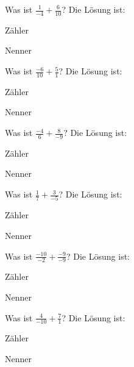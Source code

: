 \documentclass{ximera}
\begin{document}
\begin{shuffle}
\begin{question}
Was ist $\frac{1}{-4} + \frac{6}{10}$?
Die Lösung ist:
\begin{solution}
Zähler 
\end{solution}
\begin{solution}
Nenner 
\end{solution}
\end{question}


\begin{question}
Was ist $\frac{-6}{10} + \frac{5}{1}$?
Die Lösung ist:
\begin{solution}
Zähler 
\end{solution}
\begin{solution}
Nenner 
\end{solution}
\end{question}


\begin{question}
Was ist $\frac{-4}{6} + \frac{8}{-9}$?
Die Lösung ist:
\begin{solution}
Zähler 
\end{solution}
\begin{solution}
Nenner 
\end{solution}
\end{question}


\begin{question}
Was ist $\frac{1}{7} + \frac{3}{-5}$?
Die Lösung ist:
\begin{solution}
Zähler 
\end{solution}
\begin{solution}
Nenner 
\end{solution}
\end{question}


\begin{question}
Was ist $\frac{-10}{-2} + \frac{-9}{-9}$?
Die Lösung ist:
\begin{solution}
Zähler 
\end{solution}
\begin{solution}
Nenner 
\end{solution}
\end{question}


\begin{question}
Was ist $\frac{4}{-10} + \frac{7}{1}$?
Die Lösung ist:
\begin{solution}
Zähler 
\end{solution}
\begin{solution}
Nenner 
\end{solution}
\end{question}



\end{shuffle}
\end{document}
